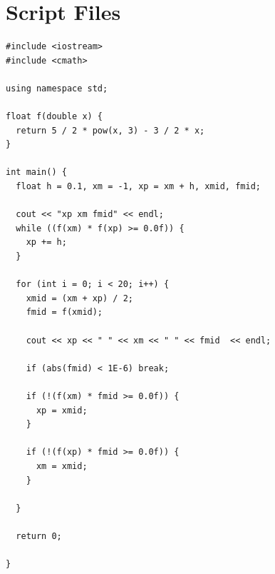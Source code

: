 \documentclass{article}
\begin{document}
\section{Script Files}
\begin{verbatim}
#include <iostream>
#include <cmath>

using namespace std;

float f(double x) {
  return 5 / 2 * pow(x, 3) - 3 / 2 * x;
}

int main() {
  float h = 0.1, xm = -1, xp = xm + h, xmid, fmid;

  cout << "xp xm fmid" << endl;
  while ((f(xm) * f(xp) >= 0.0f)) {
    xp += h;
  }

  for (int i = 0; i < 20; i++) {
    xmid = (xm + xp) / 2;
    fmid = f(xmid);

    cout << xp << " " << xm << " " << fmid  << endl;

    if (abs(fmid) < 1E-6) break;

    if (!(f(xm) * fmid >= 0.0f)) {
      xp = xmid;
    }

    if (!(f(xp) * fmid >= 0.0f)) {
      xm = xmid;
    }

  }

  return 0;

}
\end{verbatim}
\end{document}
